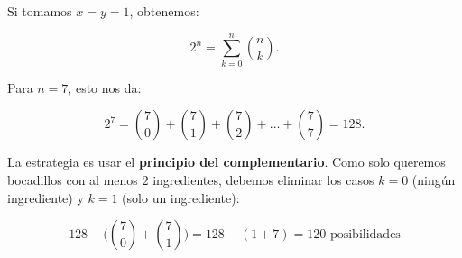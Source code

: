 \documentclass[a4paper,12pt]{article}
\begin{document}
\begin{ejercicio}[title=Ejercicio 8]

Si tomamos $x = y = 1$, obtenemos:

\[
2^n = \sum_{k=0}^{n} \binom{n}{k}.
\]

Para $n = 7$, esto nos da:

\[
2^7 = \binom{7}{0} + \binom{7}{1} + \binom{7}{2} + \dots + \binom{7}{7} = 128.
\]

\vspace{0.5em}

La estrategia es usar el \textbf{principio del complementario}. Como solo queremos bocadillos con al menos $2$ ingredientes, debemos eliminar los casos $k = 0$ (ningún ingrediente) y $k = 1$ (solo un ingrediente):

\[
128 - \Bigg(\binom{7}{0} + \binom{7}{1}\Bigg) = 128 - (1 + 7) = 120 \text{ posibilidades}
\]

\end{ejercicio}
\end{document}

